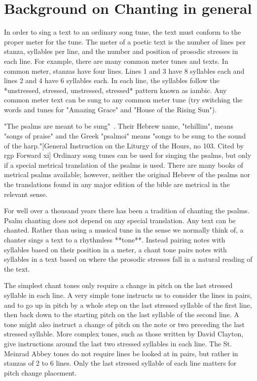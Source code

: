 \documentclass[12pt]{proposal}
\begin{document}
\section{Background on Chanting in general}

In order to sing a text to an ordinary song tune, the text must conform to the proper meter for the tune.
The meter of a poetic text is the number of lines per stanza, syllables per line, and the number and position of prosodic stresses in each line.
For example, there are many common meter tunes and texts.
In common meter, stanzas have four lines.
Lines 1 and 3 have 8 syllables each and lines 2 and 4 have 6 syllables each.
In each line, the syllables follow the *unstressed, stressed, unstressed, stressed* pattern known as iambic.
Any common meter text can be sung to any common meter tune (try switching the words and tunes for "Amazing Grace" and "House of the Rising Sun").

"The psalms are meant to be sung"~\cite[p.xi]{the_benedictine_monks_of_conception_abbey_revised_2010}.
Their Hebrew name, "tehillim", means "songs of praise" and the Greek "psalmoi" means "songs to be sung to the sound of the harp."[General Instruction on the Liturgy of the Hours, no 103.
Cited by rgp Forward xi]  Ordinary song tunes can be used for singing the psalms, but only if a special metrical translation of the psalms is used.
There are many books of metrical psalms available; however, neither the original Hebrew of the psalms nor the translations found in any major edition of the bible are metrical in the relevant sense.

For well over a thousand years there has been a tradition of chanting the psalms.
Psalm chanting does not depend on any special translation.
Any text can be chanted.
Rather than using a musical tune in the sense we normally think of, a chanter sings a text to a rhythmless **tone**.
Instead pairing notes with syllables based on their position in a meter, a chant tone pairs notes with syllables in a text based on where the prosodic stresses fall in a natural reading of the text.

The simplest chant tones only require a change in pitch on the last stressed syllable in each line.
A very simple tone instructs us to consider the lines in pairs, and to go up in pitch by a whole step on the last stressed syllable of the first line, then back down to the starting pitch on the last syllable of the second line.
A tone might also instruct a change of pitch on the note or two preceding the last stressed syllable.
More complex tones, such as those written by David Clayton, give instructions around the last two stressed syllables in each line.
The St.
Meinrad Abbey tones do not require lines be looked at in pairs, but rather in stanzas of 2 to 6 lines.
Only the last stressed syllable of each line matters for pitch change placement.
\end{document}
